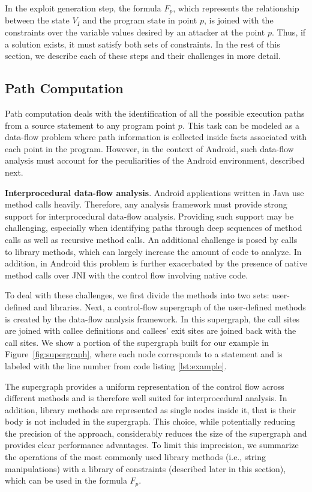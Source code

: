 In the exploit generation step, the formula $F_p$, which represents the relationship between the state $V_I$ and the program state in point $p$, is joined with the constraints over the variable values desired by an attacker at the point $p$. Thus, if a solution exists, it must satisfy both sets of constraints. In the rest of this section, we describe each of these steps and their challenges in more detail. 

\subsection{Path Computation}
Path computation deals with the identification of all the possible execution paths from a source statement to any program point $p$.  This task can be modeled as a data-flow problem where path information is collected inside facts associated with each point in the program. However, in the context of Android, such data-flow analysis must account for the peculiarities of the Android environment, described next.

\noindent
\textbf{Interprocedural data-flow analysis}. Android applications written in Java use method calls heavily. Therefore, any analysis framework must provide strong support for interprocedural data-flow analysis. Providing such support may be challenging, especially when identifying paths through deep sequences of method calls as well as recursive method calls. An additional challenge is posed by calls to library methods, which can largely increase the amount of code to analyze. In addition, in Android this problem is further exacerbated by the presence of native method calls over JNI with the control flow involving native code.

To deal with these challenges, we first divide the methods into two sets: user-defined and libraries. Next, a control-flow supergraph of the user-defined methods is created by the data-flow analysis framework. In this supergraph, the call sites are joined with callee definitions and callees' exit sites are joined back with the call sites. We show a portion of the supergraph built for our example in Figure~\ref{fig:supergraph}, where each node corresponds to a statement and is labeled with the line number from code listing \ref{lst:example}. 

The supergraph provides a uniform representation of the control flow across different methods and is therefore well suited for interprocedural analysis. In addition, library methods are represented as single nodes inside it, that is their body is not included in the supergraph. This choice, while potentially reducing the precision of the approach, considerably reduces the size of the supergraph and provides clear performance advantages. To limit this imprecision, we summarize the operations of the most commonly used library methods (i.e., string manipulations) with a library of constraints (described later in this section), which can be used in the formula $F_p$.

